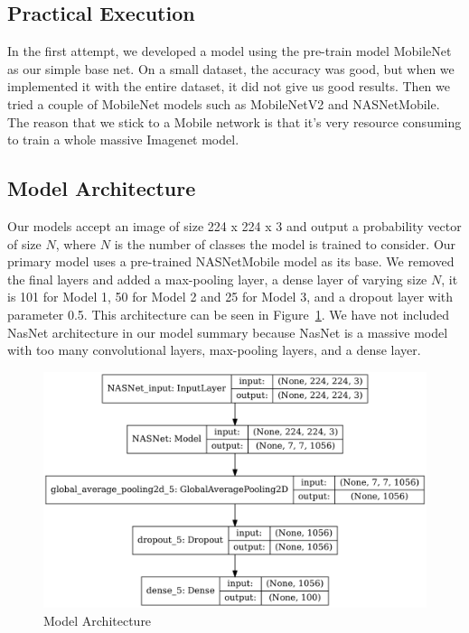 \documentclass[conference]{IEEEtran}
\begin{document}
\subsection{Practical Execution}
 
In the first attempt, we developed a model using the pre-train model MobileNet as our simple base net. On a small dataset, the accuracy was good, but when we implemented it with the entire dataset, it did not give us good results. Then we tried a couple of MobileNet models such as MobileNetV2 and NASNetMobile. The reason that we stick to a Mobile network is that it's very resource consuming to train a whole massive Imagenet model.

\subsection{Model Architecture}
Our models accept an image of size 224 x 224 x 3 and output a probability vector of size $N$, where $N$ is the number of classes the model is trained to consider. Our primary model uses a pre-trained NASNetMobile model as its base. We removed the final layers and added a max-pooling layer, a dense layer of varying size $N$, it is 101 for Model 1, 50 for Model 2 and 25 for Model 3, and a dropout layer with parameter 0.5. This architecture can be seen in Figure~\ref{fig:model}. We have not included NasNet architecture in our model summary because NasNet is a massive model with too many convolutional layers, max-pooling layers, and a dense layer.

\begin{figure}[htbp]
\centerline
{\includegraphics[width=\columnwidth]{images/model.png}}
\caption{Model Architecture}
\label{fig:model}
\end{figure}
\end{document}
